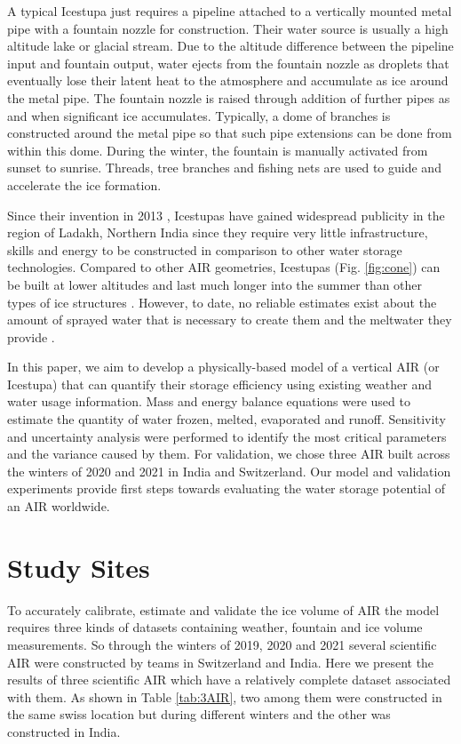 \documentclass[utf8]{frontiersSCNS} %
\begin{document}
A typical Icestupa just requires a pipeline attached to a vertically mounted metal pipe with a fountain nozzle for
construction. Their water source is usually a high altitude lake or glacial stream. Due to the altitude difference
between the pipeline input and fountain output, water ejects from the fountain nozzle as droplets that eventually lose
their latent heat to the atmosphere and accumulate as ice around the metal pipe. The fountain nozzle is raised through
addition of further pipes as and when significant ice accumulates. Typically, a dome of branches is constructed around
the metal pipe so that such pipe extensions can be done from within this dome. During the winter, the fountain is
manually activated from sunset to sunrise. Threads, tree branches and fishing nets are used to guide and accelerate the
ice formation.

Since their invention in 2013 \citep{campaign}, Icestupas have gained widespread publicity in the region of Ladakh,
Northern India since they require very little infrastructure, skills and energy to be constructed in comparison to
other water storage technologies. Compared to other AIR geometries, Icestupas (Fig. \ref{fig:cone}) can be built at
lower altitudes and last much longer into the summer than other types of ice structures \citep{campaign}. However, to
date, no reliable estimates exist about the amount of sprayed water that is necessary to create them and the meltwater
they provide \citep{Nusser_2018}. 

In this paper, we aim to develop a physically-based model of a vertical AIR (or Icestupa) that can quantify their
storage efficiency using existing weather and water usage information. Mass and energy balance equations were used to
estimate the quantity of water frozen, melted, evaporated and runoff. Sensitivity and uncertainty analysis were
performed to identify the most critical parameters and the variance caused by them. For validation, we chose three AIR
built across the winters of 2020 and 2021 in India and Switzerland. Our model and validation experiments provide first
steps towards evaluating the water storage potential of an AIR worldwide. 

\section{Study Sites}
To accurately calibrate, estimate and validate the ice volume of AIR the model requires three kinds of datasets
containing weather, fountain and ice volume measurements. So through the winters of 2019, 2020 and 2021
several scientific AIR were constructed by teams in Switzerland and India. Here we present the results of three
scientific AIR which have a relatively complete dataset associated with them. As shown in Table \ref{tab:3AIR}, two
among them were constructed in the same swiss location but during different winters and the other was constructed in
India.    
\end{document}
